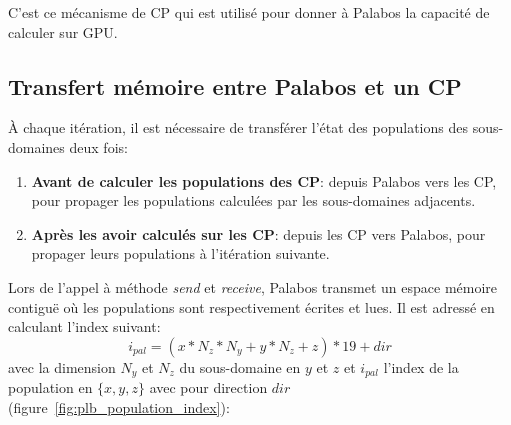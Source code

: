 C'est ce mécanisme de \ac{CP} qui est utilisé pour donner à Palabos la capacité de calculer sur \acs{GPU}.

\subsection{Transfert mémoire entre Palabos et un \acs{CP} }\label{title-transfert_palabos_cp}
À chaque itération, il est nécessaire de transférer l'état des populations des sous-domaines deux fois:
\begin{enumerate}
\item \textbf{Avant de calculer les populations des \ac{CP}}: depuis Palabos vers les \ac{CP}, pour propager les populations calculées par les sous-domaines adjacents.
\item \textbf{Après les avoir calculés sur les \ac{CP}}: depuis les \ac{CP} vers Palabos, pour propager leurs populations à l'itération suivante.
\end{enumerate}

Lors de l'appel à méthode \textit{send} et \textit{receive}, Palabos transmet un espace mémoire contiguë où les populations sont respectivement écrites et lues. Il est adressé en calculant l'index suivant:
\begin{equation}
i_{pal} = ( x*N_z*N_y + y*N_z + z) * 19 + dir
\end{equation}
avec la dimension  $N_y$ et $N_z$ du sous-domaine en $y$ et $z$ et $i_{pal}$ l'index de la population en $\{x,y,z\}$ avec pour direction $dir$ (figure~\ref{fig:plb_population_index}):

